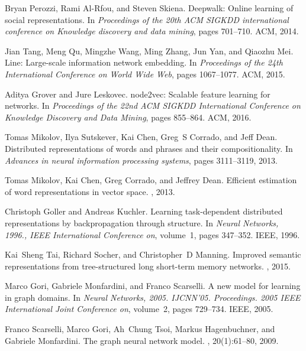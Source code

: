 \documentclass{article}
\begin{document}
\begin{thebibliography}{10}
Bryan Perozzi, Rami Al-Rfou, and Steven Skiena.
\newblock Deepwalk: Online learning of social representations.
\newblock In {\em Proceedings of the 20th ACM SIGKDD international conference
  on Knowledge discovery and data mining}, pages 701--710. ACM, 2014.

Jian Tang, Meng Qu, Mingzhe Wang, Ming Zhang, Jun Yan, and Qiaozhu Mei.
\newblock Line: Large-scale information network embedding.
\newblock In {\em Proceedings of the 24th International Conference on World
  Wide Web}, pages 1067--1077. ACM, 2015.

Aditya Grover and Jure Leskovec.
\newblock node2vec: Scalable feature learning for networks.
\newblock In {\em Proceedings of the 22nd ACM SIGKDD International Conference
  on Knowledge Discovery and Data Mining}, pages 855--864. ACM, 2016.

Tomas Mikolov, Ilya Sutskever, Kai Chen, Greg~S Corrado, and Jeff Dean.
\newblock Distributed representations of words and phrases and their
  compositionality.
\newblock In {\em Advances in neural information processing systems}, pages
  3111--3119, 2013.

Tomas Mikolov, Kai Chen, Greg Corrado, and Jeffrey Dean.
\newblock Efficient estimation of word representations in vector space.
, 2013.

Christoph Goller and Andreas Kuchler.
\newblock Learning task-dependent distributed representations by
  backpropagation through structure.
\newblock In {\em Neural Networks, 1996., IEEE International Conference on},
  volume~1, pages 347--352. IEEE, 1996.

Kai~Sheng Tai, Richard Socher, and Christopher~D Manning.
\newblock Improved semantic representations from tree-structured long
  short-term memory networks.
, 2015.

Marco Gori, Gabriele Monfardini, and Franco Scarselli.
\newblock A new model for learning in graph domains.
\newblock In {\em Neural Networks, 2005. IJCNN'05. Proceedings. 2005 IEEE
  International Joint Conference on}, volume~2, pages 729--734. IEEE, 2005.

Franco Scarselli, Marco Gori, Ah~Chung Tsoi, Markus Hagenbuchner, and Gabriele
  Monfardini.
\newblock The graph neural network model.
, 20(1):61--80, 2009.


\end{thebibliography}
\end{document}
